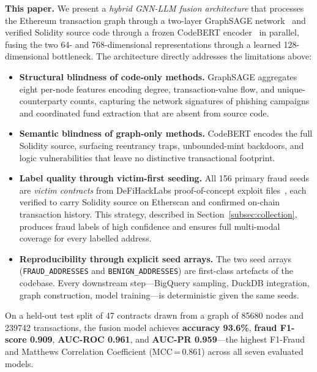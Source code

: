 \textbf{This paper.}
We present a \emph{hybrid GNN-LLM fusion architecture} that processes
the Ethereum transaction graph through a two-layer GraphSAGE
network~\cite{hamilton2017graphsage} and verified Solidity source code
through a frozen CodeBERT encoder~\cite{feng2020codebert} in parallel,
fusing the two 64- and 768-dimensional representations through a learned
128-dimensional bottleneck.  The architecture directly addresses the
limitations above:

\begin{itemize}
  \item \textbf{Structural blindness of code-only methods.}
  GraphSAGE aggregates eight per-node features encoding degree,
  transaction-value flow, and unique-counterparty counts, capturing the
  network signatures of phishing campaigns and coordinated fund extraction
  that are absent from source code.

  \item \textbf{Semantic blindness of graph-only methods.}
  CodeBERT encodes the full Solidity source, surfacing reentrancy traps,
  unbounded-mint backdoors, and logic vulnerabilities that leave no
  distinctive transactional footprint.

  \item \textbf{Label quality through victim-first seeding.}
  All 156 primary fraud seeds are \emph{victim contracts} from
  DeFiHackLabs proof-of-concept exploit files~\cite{defihacklabs2024},
  each verified to carry Solidity source on Etherscan and confirmed
  on-chain transaction history.  This strategy, described in
  Section~\ref{subsec:collection}, produces fraud labels of high
  confidence and ensures full multi-modal coverage for every labelled
  address.

  \item \textbf{Reproducibility through explicit seed arrays.}
  The two seed arrays (\texttt{FRAUD\_ADDRESSES} and
  \texttt{BENIGN\_ADDRESSES}) are first-class artefacts of the codebase.
  Every downstream step---BigQuery sampling, DuckDB integration, graph
  construction, model training---is deterministic given the same seeds.
\end{itemize}

On a held-out test split of 47 contracts drawn from a graph of
\num{85680} nodes and \num{239742} transactions, the fusion model achieves
\textbf{accuracy 93.6\%}, \textbf{fraud F1-score 0.909},
\textbf{AUC-ROC 0.961}, and \textbf{AUC-PR 0.959}---the highest
F1-Fraud and Matthews Correlation Coefficient (MCC\,=\,0.861) across all
seven evaluated models.

